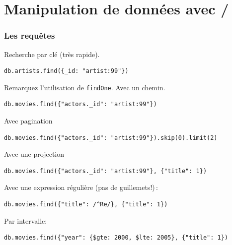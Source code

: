 \section{Manipulation de données avec \mongodb/}



\begin{frame}[fragile]
\frametitle{Les requêtes}

Recherche par clé (très rapide). 

\begin{verbatim}
db.artists.find({_id: "artist:99"})
\end{verbatim}

Remarquez l'utilisation de \texttt{findOne}. Avec un chemin.

\begin{verbatim}
db.movies.find({"actors._id": "artist:99"})
\end{verbatim}

Avec pagination
\begin{verbatim}
db.movies.find({"actors._id": "artist:99"}).skip(0).limit(2)
\end{verbatim}

Avec une \alert{projection}

\begin{verbatim}
db.movies.find({"actors._id": "artist:99"}, {"title": 1})
\end{verbatim}

Avec une expression régulière (pas de guillemets!)\,:

\begin{verbatim}
db.movies.find({"title": /^Re/}, {"title": 1})
\end{verbatim}

Par intervalle:

\begin{verbatim}
db.movies.find({"year": {$gte: 2000, $lte: 2005}, {"title": 1})
\end{verbatim}

\end{frame}



